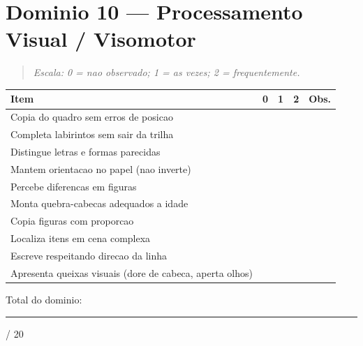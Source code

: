 \documentclass[a4paper,11pt]{book}
\begin{document}
\section{Dominio 10 --- Processamento Visual / Visomotor}
\begin{quote}\itshape Escala: 0 = nao observado; 1 = as vezes; 2 = frequentemente.\end{quote}
\begin{tabular}{@{}p{10.5cm}ccc p{0.5cm}@{}}\toprule
Item & 0 & 1 & 2 & Obs. \\\midrule
Copia do quadro sem erros de posicao & & & & \\
Completa labirintos sem sair da trilha & & & & \\
Distingue letras e formas parecidas & & & & \\
Mantem orientacao no papel (nao inverte) & & & & \\
Percebe diferencas em figuras & & & & \\
Monta quebra-cabecas adequados a idade & & & & \\
Copia figuras com proporcao & & & & \\
Localiza itens em cena complexa & & & & \\
Escreve respeitando direcao da linha & & & & \\
Apresenta queixas visuais (dore de cabeca, aperta olhos) & & & & \\
\bottomrule\end{tabular}
\vspace{0.2cm}\noindent\small Total do dominio: \rule{1cm}{0.3pt} / 20\par\medskip
\end{document}
